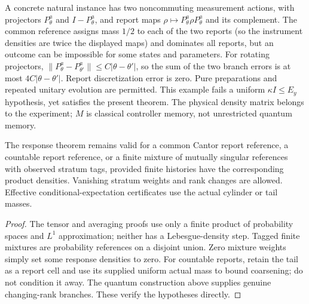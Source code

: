 A concrete natural instance has two noncommuting measurement actions, with projectors $P_\theta^a$ and $I-P_\theta^a$, and report maps $\rho\mapsto P_\theta^a\rho P_\theta^a$ and its complement. The common reference assigns mass $1/2$ to each of the two reports (so the instrument densities are twice the displayed maps) and dominates all reports, but an outcome can be impossible for some states and parameters. For rotating projectors,
$\|P_\theta^a-P_{\theta'}^a\|\le C|\theta-\theta'|$, so the sum of the two branch errors is at most $4C|\theta-\theta'|$. Report discretization error is zero. Pure preparations and repeated unitary evolution are permitted. This example fails a uniform $\kappa I\le E_y$ hypothesis, yet satisfies the present theorem. The physical density matrix belongs to the experiment; $M$ is classical controller memory, not unrestricted quantum memory.

\begin{corollary}\label{cor:strata}
The response theorem remains valid for a common Cantor report reference, a countable report reference, or a finite mixture of mutually singular references with observed stratum tags, provided finite histories have the corresponding product densities. Vanishing stratum weights and rank changes are allowed. Effective conditional-expectation certificates use the actual cylinder or tail masses.
\end{corollary}
\begin{proof}
The tensor and averaging proofs use only a finite product of probability spaces and $L^1$ approximation; neither has a Lebesgue-density step. Tagged finite mixtures are probability references on a disjoint union. Zero mixture weights simply set some response densities to zero. For countable reports, retain the tail as a report cell and use its supplied uniform actual mass to bound coarsening; do not condition it away. The quantum construction above supplies genuine changing-rank branches. These verify the hypotheses directly.
\end{proof}
